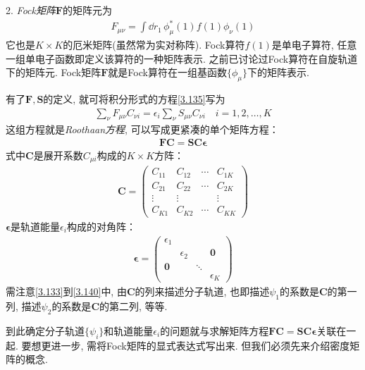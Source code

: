 2. \emph{Fock矩阵$\mathbf{F}$}的矩阵元为
\begin{align}
	F_{\mu\nu} = \int\dd{r}_1\,\phi_\mu^*(1)f(1)\phi_\nu(1)
\end{align}
它也是$K\times K$的厄米矩阵(虽然常为实对称阵). 
Fock算符$f(1)$是单电子算符, 
任意一组单电子函数即定义该算符的一种矩阵表示. 
之前已讨论过Fock算符在自旋轨道下的矩阵元. 
Fock矩阵$\mathbf{F}$就是Fock算符在一组基函数$\{\phi_\mu\}$下的矩阵表示.


有了$\mathbf{F,S}$的定义, 
就可将积分形式的\hft 方程\eqref{3.135}写为
\begin{align}
	\sum_\nu F_{\mu\nu} C_{\nu i} = \epsilon_i\sum_{\nu}S_{\mu\nu}C_{\nu i}\quad i=1,2,\ldots,K
\end{align}
这组方程就是\emph{Roothaan方程}, 
可以写成更紧凑的单个矩阵方程：
\begin{align}
	\mathbf{FC=SC}\bm{\epsilon}
\end{align}
式中$\mathbf{C}$是展开系数$C_{\mu i}$构成的$K\times K$方阵：
\begin{align}
	\label{3.140}
	\mathbf{C} =
	\begin{pmatrix}
		C_{11} & C_{12} & \cdots & C_{1K} \\
		C_{21} & C_{22} & \cdots & C_{2K} \\
		\vdots & \vdots &        & \vdots \\
		C_{K1} & C_{K2} & \cdots & C_{KK}
	\end{pmatrix}
\end{align} 
$\bm{\epsilon}$是轨道能量$\epsilon_i$构成的对角阵：
\begin{align}
	\bm{\epsilon} = 
	\begin{pmatrix}
		\epsilon_1 &            &        &            \\
		& \epsilon_2 &        & \mathbf{0} \\
		\mathbf{0} &            & \ddots &            \\
		&            &        & \epsilon_K
	\end{pmatrix}
\end{align}
需注意\eqref{3.133}到\eqref{3.140}中, 
由$\mathbf{C}$的列来描述分子轨道, 
也即描述$\psi_1$的系数是$\mathbf{C}$的第一列, 
描述$\psi_2$的系数是$\mathbf{C}$的第二列, 
等等.

到此确定\hft 分子轨道$\{\psi_i\}$和轨道能量$\epsilon_i$的问题就与求解矩阵方程$\mathbf{FC=SC}\bm{\epsilon}$关联在一起. 
要想更进一步, 
需将Fock矩阵的显式表达式写出来. 
但我们必须先来介绍密度矩阵的概念.


